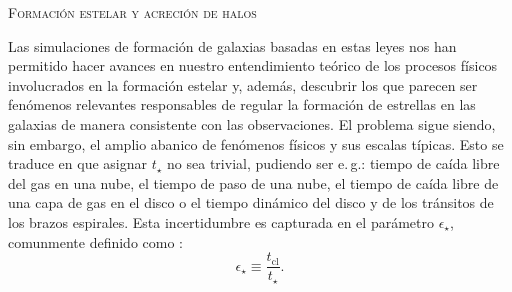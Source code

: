 \documentclass[xcolor=dvipsnames,4pt,hyperref={colorlinks,citecolor=black,linkcolor=black,urlcolor=black}]{beamer}
\begin{document}
\begin{frame}[allowframebreaks]{\textsc{Formación estelar y acreción de halos}}
\begin{description}
Las simulaciones de formación de galaxias basadas en estas leyes nos han permitido hacer avances en
nuestro entendimiento teórico de los procesos físicos involucrados en la formación estelar
\citep{Krumholz2014} y, además, descubrir los que parecen ser fenómenos relevantes responsables de
regular la formación de estrellas en las galaxias de manera consistente con las observaciones. El
problema sigue siendo, sin embargo, el amplio abanico de fenómenos físicos y sus escalas típicas.
Esto se traduce en que asignar $t_\star$ no sea trivial, pudiendo ser e.\,g.: tiempo de caída libre
del gas en una nube, el tiempo de paso de una nube, el tiempo de caída libre de una capa de gas en
el disco o el tiempo dinámico del disco y de los tránsitos de los brazos espirales. Esta
incertidumbre es capturada en el parámetro $\epsilon_\star$, comunmente definido como
\citep{Krumholz2014}:
$$
\epsilon_\star \equiv \frac{t_\text{cl}}{t_\star}.
$$


\end{description}
\end{frame}
\end{document}
